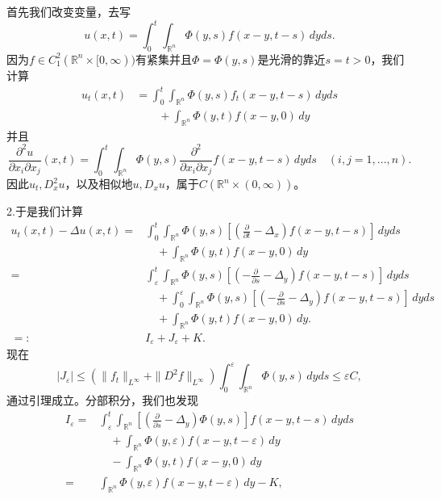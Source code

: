 \documentclass[leqno]{article}
\numberwithin{equation}{subsection}%
\begin{document}
首先我们改变变量，去写
\begin{equation*}
u(x,t)=\int_{0}^{t}\int_{\mathbb{R}^{n}}\Phi(y,s)f(x-y,t-s)\,dyds.
\end{equation*}
因为$f\in C_{1}^{2}(\mathbb{R}^{n}\times[0,\infty))$有紧集并且$\Phi=\Phi(y,s)$是光滑的靠近$s=t>0$，我们计算
\begin{equation*}
\begin{aligned}
u_{t}(x,t)&=\int_{0}^{t}\int_{\mathbb{R}^{n}}\Phi(y,s)f_{t}(x-y,t-s)\,dyds\\
&{\qquad}+\int_{\mathbb{R}^{n}}\Phi(y,t)f(x-y,0)\,dy
\end{aligned}
\end{equation*}
并且
\begin{equation*}
\frac{\partial^{2}u}{\partial x_{i}\partial x_{j}}(x,t)=\int_{0}^{t}\int_{\mathbb{R}^{n}}\Phi(y,s)\frac{\partial^{2}}{\partial x_{i}\partial x_{j}}f(x-y,t-s)\,dyds\quad(i,j=1,...,n).
\end{equation*}
因此$u_{t},D_{x}^{2}u$，以及相似地$u,D_{x}u$，属于$C(\mathbb{R}^{n}\times(0,\infty))$。
\par
2.于是我们计算
\begin{equation}
\begin{aligned}
u_{t}(x,t)-\Delta u(x,t)=&\int_{0}^{t}\int_{\mathbb{R}^{n}}\Phi(y,s)[(\frac{\partial}{\partial t}-\Delta_{x})f(x-y,t-s)]\,dyds\\
&{\quad}+\int_{\mathbb{R}^{n}}\Phi(y,t)f(x-y,0)\,dy\\
=&\int_{\varepsilon}^{t}\int_{\mathbb{R}^{n}}\Phi(y,s)[(-\frac{\partial}{\partial s}-\Delta_{y})f(x-y,t-s)]\,dyds\\
&{\quad}+\int_{0}^{\varepsilon}\int_{\mathbb{R}^{n}}\Phi(y,s)[(-\frac{\partial}{\partial s}-\Delta_{y})f(x-y,t-s)]\,dyds\\
&{\quad}+\int_{\mathbb{R}^{n}}\Phi(y,t)f(x-y,0)\,dy.\\
=:&I_{\varepsilon}+J_{\varepsilon}+K.
\end{aligned}
\end{equation}
现在
\begin{equation}
|J_{\varepsilon}|\leq(\|f_{t}\|_{L^{\infty}}+\|D^{2}f\|_{L^{\infty}})\int_{0}^{\varepsilon}\int_{\mathbb{R}^{n}}\Phi(y,s)\,dyds\leq\varepsilon C,
\end{equation}
通过引理成立。分部积分，我们也发现
\begin{equation}
\begin{aligned}
I_{\varepsilon}=&\int_{\varepsilon}^{t}\int_{\mathbb{R}^{n}}[(\frac{\partial}{\partial  s}-\Delta_{y})\Phi(y,s)]f(x-y,t-s)\,dyds\\
&{\quad}+\int_{\mathbb{R}^{n}}\Phi(y,\varepsilon)f(x-y,t-\varepsilon)\,dy\\
&{\quad}-\int_{\mathbb{R}^{n}}\Phi(y,t)f(x-y,0)\,dy\\
=&\int_{\mathbb{R}^{n}}\Phi(y,\varepsilon)f(x-y,t-\varepsilon)\,dy-K,
\end{aligned}
\end{equation}
\end{document}
